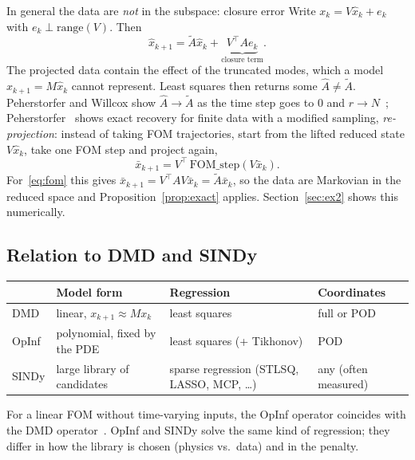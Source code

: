 \documentclass[11pt]{article}
\theoremstyle{remark}\newtheorem{remark}{Remark}
\newcommand{\xh}{\hat{x}}
\newcommand{\Ah}{\hat{A}}
\newcommand{\At}{\tilde{A}}
\begin{document}
\begin{warnbox}{In general the data are \emph{not} in the subspace: closure error}
Write $x_k=V\xh_k+e_k$ with $e_k\perp\mathrm{range}(V)$. Then
\[
\xh_{k+1}=\At\xh_k+\underbrace{V^\top A e_k}_{\text{closure term}} .
\]
The projected data contain the effect of the truncated modes, which a model $\xh_{k+1}=M\xh_k$ cannot represent. Least squares then returns some $\Ah\neq\At$. Peherstorfer and Willcox show $\Ah\to\At$ as the time step goes to $0$ and $r\to N$~\cite[Thm.~1]{PW16}; Peherstorfer~\cite{P20} shows exact recovery for finite data with a modified sampling, \emph{re-projection}: instead of taking FOM trajectories, start from the lifted reduced state $V\xh_k$, take one FOM step and project again,
\[
\bar x_{k+1}=V^\top\,\mathrm{FOM\_step}(V\bar x_k).
\]
For~\eqref{eq:fom} this gives $\bar x_{k+1}=V^\top AV\bar x_k=\At\bar x_k$, so the data are Markovian in the reduced space and Proposition~\ref{prop:exact} applies. Section~\ref{sec:ex2} shows this numerically.
\end{warnbox}

\subsection{Relation to DMD and SINDy}
\begin{center}
\begin{tabular}{@{}>{\raggedright}p{1.6cm}>{\raggedright}p{4.2cm}>{\raggedright}p{4.6cm}>{\raggedright\arraybackslash}p{3.4cm}@{}}
\toprule
& Model form & Regression & Coordinates \\
\midrule
DMD & linear, $x_{k+1}\approx Mx_k$ & least squares & full or POD \\
OpInf & polynomial, fixed by the PDE & least squares (+ Tikhonov) & POD \\
SINDy & large library of candidates & sparse regression (STLSQ, LASSO, MCP, \dots) & any (often measured) \\
\bottomrule
\end{tabular}
\end{center}
For a linear FOM without time-varying inputs, the OpInf operator coincides with the DMD operator~\cite[Sec.~1]{PW16}. OpInf and SINDy solve the same kind of regression; they differ in how the library is chosen (physics vs.\ data) and in the penalty.

\end{document}
